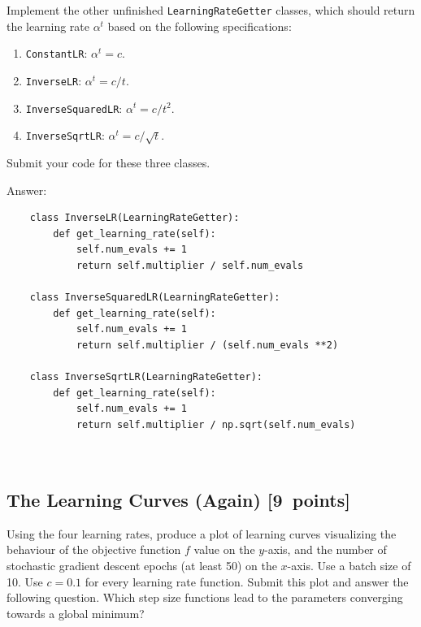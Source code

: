 \documentclass{article}
\newcommand{\blu}[1]{{\textcolor{blu}{#1}}}
\newenvironment{answer}{\par\begingroup\color{gre}Answer: }{\endgroup}
\let\ask\blu
\newcommand\pts[1]{\textcolor{pointscolour}{[#1~points]}}
\begin{document}
Implement the other unfinished \texttt{LearningRateGetter} classes, which should return the learning rate $\alpha^t$ based on the following
specifications:
\begin{enumerate}
	\item \texttt{ConstantLR}: $\alpha^t = c$.
	\item \texttt{InverseLR}: $\alpha^t = c/t$.
	\item \texttt{InverseSquaredLR}: $\alpha^t = c/t^2$.
	\item \texttt{InverseSqrtLR}: $\alpha^t = c/\sqrt{t}$.
\end{enumerate}
\ask{Submit your code for these three classes.}

\begin{answer}
	\begin{verbatim}
	class InverseLR(LearningRateGetter):
		def get_learning_rate(self):
			self.num_evals += 1
			return self.multiplier / self.num_evals

	class InverseSquaredLR(LearningRateGetter):
		def get_learning_rate(self):
			self.num_evals += 1
			return self.multiplier / (self.num_evals **2)

	class InverseSqrtLR(LearningRateGetter):
		def get_learning_rate(self):
			self.num_evals += 1
			return self.multiplier / np.sqrt(self.num_evals)

		
	\end{verbatim}
\end{answer}

\subsection{The Learning Curves (Again) \pts{9}}

Using the four learning rates, produce a plot of learning curves visualizing the behaviour of the objective function $f$ value on the $y$-axis, and the number of stochastic gradient descent epochs (at least 50) on the $x$-axis. Use a batch size of 10. Use $c = 0.1$ for every learning rate function. \blu{Submit this plot and answer the following question. Which step size functions lead to the parameters converging towards a global minimum?}
\end{document}
